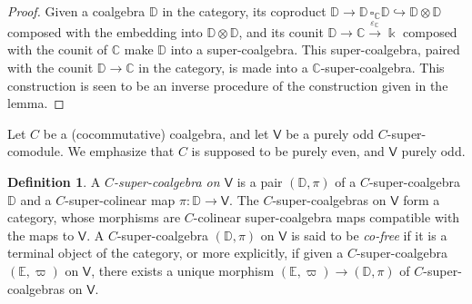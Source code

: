 \documentclass[11pt, a4paper]{amsart}
\theoremstyle{definition}
\newtheorem{definition}[theorem]{Definition}
\numberwithin{equation}{section}
\begin{document}
\begin{proof}
Given a coalgebra $\mathbb{D}$ in the category, its coproduct $\mathbb{D} \to \mathbb{D}\, \square_{\mathbb{C}} \mathbb{D} \hookrightarrow \mathbb{D} \otimes \mathbb{D}$ composed with the embedding into $\mathbb{D} \otimes \mathbb{D}$, and its counit $\mathbb{D} \to \mathbb{C} \xrightarrow{\varepsilon_{\mathbb{C}}} \Bbbk$ composed with the counit of $\mathbb{C}$ make $\mathbb{D}$ into a super-coalgebra.
This super-coalgebra, paired with the counit $\mathbb{D} \to \mathbb{C}$ in the category, is made into a $\mathbb{C}$-super-coalgebra.
This construction is seen to be an inverse procedure of the construction given in the lemma.
\end{proof}

Let $C$ be a (cocommutative) coalgebra, and let $\mathsf{V}$ be a purely odd $C$-super-comodule.
We emphasize that $C$ is supposed to be purely even, and $\mathsf{V}$ purely odd. 

\begin{definition}\label{D32}
A \emph{$C$-super-coalgebra on $\mathsf{V}$} is a  pair $(\mathbb{D}, \pi)$ of a $C$-super-coalgebra $\mathbb{D}$ and a $C$-super-colinear map $\pi: \mathbb{D} \to \mathsf{V}$. The $C$-super-coalgebras on $\mathsf{V}$
form a category, whose
morphisms are $C$-colinear super-coalgebra maps compatible with the maps to $\mathsf{V}$.
A $C$-super-coalgebra $(\mathbb{D}, \pi)$ on $\mathsf{V}$ is said to be \emph{co-free} if it is a terminal object of the category, or more explicitly, if given a $C$-super-coalgebra $(\mathbb{E}, \varpi)$ on $\mathsf{V}$, there exists a unique 
morphism $(\mathbb{E}, \varpi) \to (\mathbb{D}, \pi)$ of $C$-super-coalgebras on $\mathsf{V}$.
\end{definition}
\end{document}
